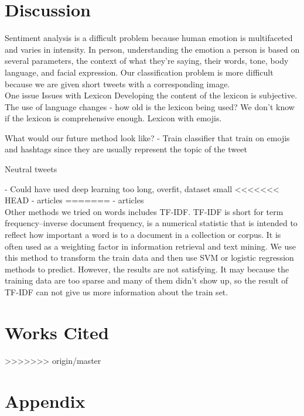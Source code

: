 \documentclass[]{article}
\begin{document}
\section{Discussion}

Sentiment analysis is a difficult problem because human emotion is multifaceted and varies in intensity. In person, understanding the emotion a person is based on several parameters, the context of what they're saying, their words, tone, body language, and facial expression. Our classification problem is more difficult because we are given short tweets with a corresponding image. \\

One issue 
Issues with Lexicon
Developing the content of the lexicon is subjective. The use of language changes - how old is the lexicon being used? We don't know if the lexicon is comprehensive enough. Lexicon with emojis. 

What would our future method look like?
- Train classifier that train on emojis and hashtags since they are usually represent the topic of the tweet


Neutral tweets 


- Could have used deep learning 
	too long, overfit, dataset small
<<<<<<< HEAD
- articles 
=======
- articles \\
Other methods we tried on words includes TF-IDF. TF-IDF is short for term frequency–inverse document frequency, is a numerical statistic that is intended to reflect how important a word is to a document in a collection or corpus. It is often used as a weighting factor in information retrieval and text mining. We use this method to transform the train data and then use SVM or logistic regression methods to predict. However, the results are not satisfying. It may because the training data are too sparse and many of them didn't show up, so the result of TF-IDF can not give us more information about the train set.

\section{Works Cited}
\begin{thebibliography}{1}


\end{thebibliography}
>>>>>>> origin/master

\section{Appendix}

%
\end{document}
